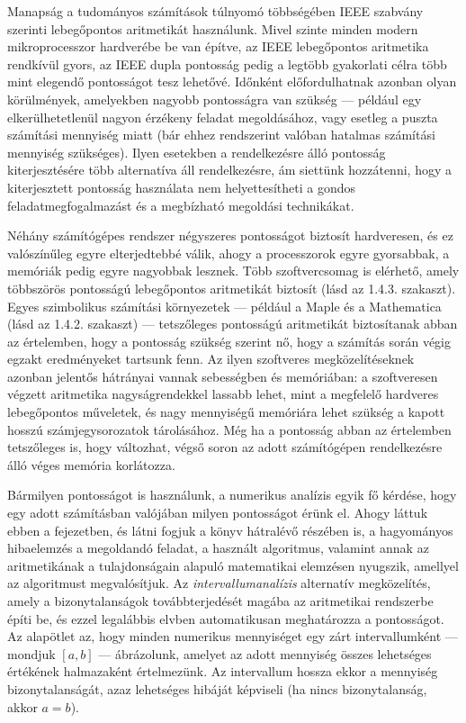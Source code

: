 \documentclass[
  magyar,
  11pt]{article}
\begin{document}
Manapság a tudományos számítások túlnyomó többségében IEEE szabvány
szerinti lebegőpontos aritmetikát használunk. Mivel szinte minden modern
mikroprocesszor hardverébe be van építve, az IEEE lebegőpontos
aritmetika rendkívül gyors, az IEEE dupla pontosság pedig a legtöbb
gyakorlati célra több mint elegendő pontosságot tesz lehetővé. Időnként
előfordulhatnak azonban olyan körülmények, amelyekben nagyobb
pontosságra van szükség --- például egy elkerülhetetlenül nagyon
érzékeny feladat megoldásához, vagy esetleg a puszta számítási mennyiség
miatt (bár ehhez rendszerint valóban hatalmas számítási mennyiség
szükséges). Ilyen esetekben a rendelkezésre álló pontosság
kiterjesztésére több alternatíva áll rendelkezésre, ám siettünk
hozzátenni, hogy a kiterjesztett pontosság használata nem
helyettesítheti a gondos feladatmegfogalmazást és a megbízható megoldási
technikákat.

Néhány számítógépes rendszer négyszeres pontosságot biztosít
hardveresen, és ez valószínűleg egyre elterjedtebbé válik, ahogy a
processzorok egyre gyorsabbak, a memóriák pedig egyre nagyobbak lesznek.
Több szoftvercsomag is elérhető, amely többszörös pontosságú
lebegőpontos aritmetikát biztosít (lásd az 1.4.3. szakaszt). Egyes
szimbolikus számítási környezetek --- például a Maple és a Mathematica
(lásd az 1.4.2. szakaszt) --- tetszőleges pontosságú aritmetikát
biztosítanak abban az értelemben, hogy a pontosság szükség szerint nő,
hogy a számítás során végig egzakt eredményeket tartsunk fenn. Az ilyen
szoftveres megközelítéseknek azonban jelentős hátrányai vannak
sebességben és memóriában: a szoftveresen végzett aritmetika
nagyságrendekkel lassabb lehet, mint a megfelelő hardveres lebegőpontos
műveletek, és nagy mennyiségű memóriára lehet szükség a kapott hosszú
számjegysorozatok tárolásához. Még ha a pontosság abban az értelemben
tetszőleges is, hogy változhat, végső soron az adott számítógépen
rendelkezésre álló véges memória korlátozza.

Bármilyen pontosságot is használunk, a numerikus analízis egyik fő
kérdése, hogy egy adott számításban valójában milyen pontosságot érünk
el. Ahogy láttuk ebben a fejezetben, és látni fogjuk a könyv hátralévő
részében is, a hagyományos hibaelemzés a megoldandó feladat, a használt
algoritmus, valamint annak az aritmetikának a tulajdonságain alapuló
matematikai elemzésen nyugszik, amellyel az algoritmust megvalósítjuk.
Az \emph{intervallumanalízis} alternatív megközelítés, amely a
bizonytalanságok továbbterjedését magába az aritmetikai rendszerbe építi
be, és ezzel legalábbis elvben automatikusan meghatározza a pontosságot.
Az alapötlet az, hogy minden numerikus mennyiséget egy zárt
intervallumként --- mondjuk \([a, b]\) --- ábrázolunk, amelyet az adott
mennyiség összes lehetséges értékének halmazaként értelmezünk. Az
intervallum hossza ekkor a mennyiség bizonytalanságát, azaz lehetséges
hibáját képviseli (ha nincs bizonytalanság, akkor \(a = b\)).
\end{document}
